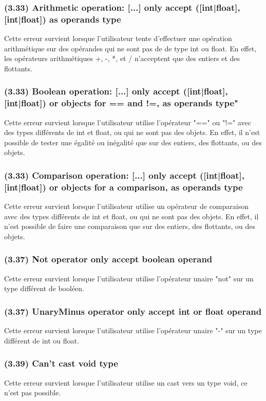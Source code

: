 \documentclass[12pt, a4paper, one side]{article}
\begin{document}
    \subsubsection{(3.33) Arithmetic operation: [...] only accept ([int|float], [int|float]) as operands type}
    Cette erreur survient lorsque l'utilisateur tente d'effectuer une opération arithmétique sur des opérandes qui ne sont pas de de type int ou float. En effet, les opérateurs arithmétiques +, -, *, et / n'acceptent que des entiers et des flottants.

    \subsubsection{(3.33) Boolean operation: [...] only accept ([int|float], [int|float]) or objects for == and !=, as operands type"}
    Cette erreur survient lorsque l'utilisateur utilise l'opérateur "==" ou "!=" avec des types différents de int et float, ou qui ne sont pas des objets. En effet, il n'est possible de tester une égalité ou inégalité que sur des entiers, des flottants, ou des objets.

    \subsubsection{(3.33) Comparison operation: [...] only accept ([int|float], [int|float]) or objects for a comparison, as operands type}
    Cette erreur survient lorsque l'utilisateur utilise un opérateur de comparaison avec des types différents de int et float, ou qui ne sont pas des objets. En effet, il n'est possible de faire une comparaison que sur des entiers, des flottants, ou des objets.

    \subsubsection{(3.37) Not operator only accept boolean operand}
    Cette erreur survient lorsque l'utilisateur utilise l'opérateur unaire "not" sur un type différent de booléen.

    \subsubsection{(3.37) UnaryMinus operator only accept int or float operand}
    Cette erreur survient lorsque l'utilisateur utilise l'opérateur unaire "-" sur un type différent de int ou float.

    \subsubsection{(3.39) Can't cast void type}
    Cette erreur survient lorsque l'utilisateur utilise un cast vers un type void, ce n'est pas possible.
\end{document}
